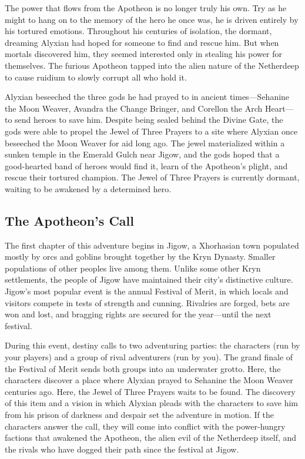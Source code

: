 \documentclass[10pt,a4paper,twoside,bg=print,twocolumn,openany,nodeprecatedcode]{dndbook}
\begin{document}
The power that flows from the Apotheon is no longer truly his own. Try as he might to hang on to the memory of the hero he once was, he is driven entirely by his tortured emotions. Throughout his centuries of isolation, the dormant, dreaming Alyxian had hoped for someone to find and rescue him. But when mortals discovered him, they seemed interested only in stealing his power for themselves. The furious Apotheon tapped into the alien nature of the Netherdeep to cause ruidium to slowly corrupt all who hold it.

Alyxian beseeched the three gods he had prayed to in ancient times—Sehanine the Moon Weaver, Avandra the Change Bringer, and Corellon the Arch Heart—to send heroes to save him. Despite being sealed behind the Divine Gate, the gods were able to propel the Jewel of Three Prayers to a site where Alyxian once beseeched the Moon Weaver for aid long ago. The jewel materialized within a sunken temple in the Emerald Gulch near Jigow, and the gods hoped that a good-hearted band of heroes would find it, learn of the Apotheon's plight, and rescue their tortured champion. The Jewel of Three Prayers is currently dormant, waiting to be awakened by a determined hero.

\subsection{The Apotheon's Call}
The first chapter of this adventure begins in Jigow, a Xhorhasian town populated mostly by orcs and goblins brought together by the Kryn Dynasty. Smaller populations of other peoples live among them. Unlike some other Kryn settlements, the people of Jigow have maintained their city's distinctive culture. Jigow's most popular event is the annual Festival of Merit, in which locals and visitors compete in tests of strength and cunning. Rivalries are forged, bets are won and lost, and bragging rights are secured for the year—until the next festival.

During this event, destiny calls to two adventuring parties: the characters (run by your players) and a group of rival adventurers (run by you). The grand finale of the Festival of Merit sends both groups into an underwater grotto. Here, the characters discover a place where Alyxian prayed to Sehanine the Moon Weaver centuries ago. Here, the Jewel of Three Prayers waits to be found. The discovery of this item and a vision in which Alyxian pleads with the characters to save him from his prison of darkness and despair set the adventure in motion. If the characters answer the call, they will come into conflict with the power-hungry factions that awakened the Apotheon, the alien evil of the Netherdeep itself, and the rivals who have dogged their path since the festival at Jigow.
\end{document}
